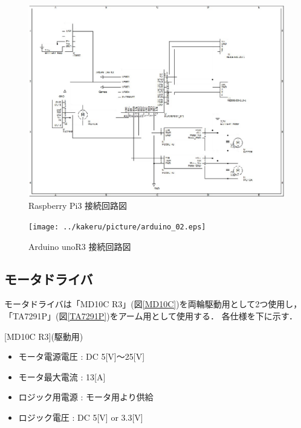 \newpage
\begin{figure}[h]
 \centering
 \includegraphics[clip,scale=0.35]{../kakeru/picture/raspberryPi3.eps}
 \caption{Raspberry Pi3 接続回路図}
 \label{c_raspberry}
\end{figure}

\begin{figure}[h]
 \centering
 \texttt{[image: ../kakeru/picture/arduino\_02.eps]}
 \caption{Arduino unoR3 接続回路図}
 \label{c_arduino}
\end{figure}
\newpage

\newpage
\subsection{モータドライバ}
モータドライバは「MD10C R3」(図\ref{MD10C})を両輪駆動用として2つ使用し，
「TA7291P」(図\ref{TA7291P})をアーム用として使用する．
各仕様を下に示す．

[MD10C R3](駆動用)
\begin{itemize}
 \item モータ電源電圧 : DC 5[V]$〜$25[V]
 \item モータ最大電流 : 13[A]
 \item ロジック用電源 : モータ用より供給
 \item ロジック電圧   : DC 5[V] or 3.3[V]
\end{itemize}

